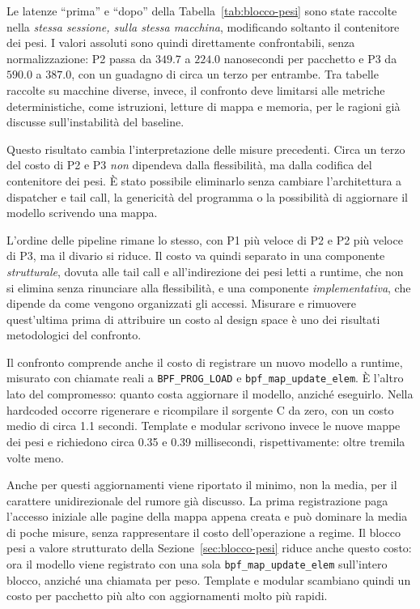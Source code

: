 \documentclass[binding=0.6cm,italian,oneside,noexaminfo]{sapthesis}
\begin{document}
Le latenze ``prima'' e ``dopo'' della Tabella~\ref{tab:blocco-pesi} sono state raccolte nella \emph{stessa sessione, sulla stessa macchina}, modificando soltanto il contenitore dei pesi. I valori assoluti sono quindi direttamente confrontabili, senza normalizzazione: P2 passa da $349.7$ a $224.0$ nanosecondi per pacchetto e P3 da $590.0$ a $387.0$, con un guadagno di circa un terzo per entrambe. Tra tabelle raccolte su macchine diverse, invece, il confronto deve limitarsi alle metriche deterministiche, come istruzioni, letture di mappa e memoria, per le ragioni già discusse sull'instabilità del baseline.

Questo risultato cambia l'interpretazione delle misure precedenti. Circa un terzo del costo di P2 e P3 \emph{non} dipendeva dalla flessibilità, ma dalla codifica del contenitore dei pesi. È stato possibile eliminarlo senza cambiare l'architettura a dispatcher e tail call, la genericità del programma o la possibilità di aggiornare il modello scrivendo una mappa.

L'ordine delle pipeline rimane lo stesso, con P1 più veloce di P2 e P2 più veloce di P3, ma il divario si riduce. Il costo va quindi separato in una componente \emph{strutturale}, dovuta alle tail call e all'indirezione dei pesi letti a runtime, che non si elimina senza rinunciare alla flessibilità, e una componente \emph{implementativa}, che dipende da come vengono organizzati gli accessi. Misurare e rimuovere quest'ultima prima di attribuire un costo al design space è uno dei risultati metodologici del confronto.

Il confronto comprende anche il costo di registrare un nuovo modello a runtime, misurato con chiamate reali a \texttt{BPF\_PROG\_LOAD} e \texttt{bpf\_map\_update\_elem}. È l'altro lato del compromesso: quanto costa aggiornare il modello, anziché eseguirlo. Nella hardcoded occorre rigenerare e ricompilare il sorgente C da zero, con un costo medio di circa 1.1 secondi. Template e modular scrivono invece le nuove mappe dei pesi e richiedono circa 0.35 e 0.39 millisecondi, rispettivamente: oltre tremila volte meno.

Anche per questi aggiornamenti viene riportato il minimo, non la media, per il carattere unidirezionale del rumore già discusso. La prima registrazione paga l'accesso iniziale alle pagine della mappa appena creata e può dominare la media di poche misure, senza rappresentare il costo dell'operazione a regime. Il blocco pesi a valore strutturato della Sezione~\ref{sec:blocco-pesi} riduce anche questo costo: ora il modello viene registrato con una sola \texttt{bpf\_map\_update\_elem} sull'intero blocco, anziché una chiamata per peso. Template e modular scambiano quindi un costo per pacchetto più alto con aggiornamenti molto più rapidi.
\end{document}
